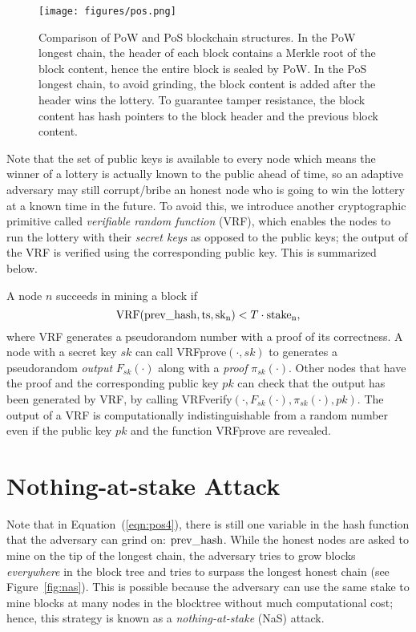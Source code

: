\documentclass{article}
\begin{document}
\begin{figure}
    \centering
\texttt{[image: figures/pos.png]}
\caption{Comparison of PoW and PoS blockchain structures. In  the PoW longest chain, the header of each block contains a Merkle root of the block content, hence the entire block is sealed by PoW. In the PoS longest chain, to avoid grinding, the block content is added after the header wins the lottery. To guarantee tamper resistance, the block content has hash pointers to the block header and the previous block content. }
\label{fig:pos}
\end{figure}

Note that the set of public keys is available to every node which means the winner of a lottery is actually known to the public ahead of time, so an adaptive adversary may still corrupt/bribe an honest node who is going to win the lottery at a known time in the future. To avoid this, we introduce another cryptographic primitive called {\it verifiable random function} (VRF), which enables the nodes to run the lottery with their {\em secret keys} as opposed to the public keys; the output of the VRF is verified using the corresponding public key. This is summarized below. 

 A node $n$ succeeds in mining a block if
\begin{equation}
    \label{eqn:pos4}
    {\rm VRF(prev\_hash,ts,sk_n)} < T\cdot{\rm stake_n},
\end{equation}
where VRF generates a pseudorandom number with a proof of its correctness. A node with a secret key $sk$ can call {\sc VRFprove}$(\cdot,sk)$ to generates a pseudorandom {\em output} $F_{sk}(\cdot)$ along with a {\em proof} $\pi_{sk}(\cdot)$. Other nodes that have the proof and the corresponding public key $pk$ can check that the output has been generated by VRF, by calling {\sc VRFverify}$(\cdot,F_{sk}(\cdot),\pi_{sk}(\cdot),pk)$. The output of a VRF is computationally indistinguishable from a random number even if the public key $pk$ and the function {\sc VRFprove} are revealed.

\section*{Nothing-at-stake Attack}

Note that in Equation~(\ref{eqn:pos4}), there is still one variable in the hash function that the adversary can grind on: ${\rm prev\_hash}$. While the honest nodes are asked to mine on the tip of the longest chain, the adversary tries to grow blocks {\em everywhere} in the block tree and tries to surpass the longest honest chain (see Figure~\ref{fig:nas}). This is possible because the adversary can use the same stake to mine blocks at many nodes in the blocktree without much computational cost; hence, this strategy is  known as a {\em nothing-at-stake} (NaS) attack.
\end{document}
